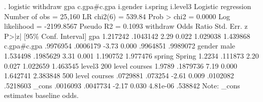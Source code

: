 . logistic withdraw gpa c.gpa\#c.gpa i.gender i.spring i.level3
{\smallskip}
Logistic regression                             Number of obs     =     25,160
                                                LR chi2(6)        =     539.84
                                                Prob > chi2       =     0.0000
Log likelihood = -2199.8567                     Pseudo R2         =     0.1093
{\smallskip}
          withdraw {\VBAR} Odds Ratio   Std. Err.      z    P>|z|     [95\% Conf. Interval]
               gpa {\VBAR}   1.217242   .1043142     2.29   0.022     1.029038    1.439868
                   {\VBAR}
       c.gpa\#c.gpa {\VBAR}   .9976954   .0006179    -3.73   0.000     .9964851    .9989072
                   {\VBAR}
            gender {\VBAR}
             male  {\VBAR}   1.534498   .1985629     3.31   0.001     1.190752    1.977476
                   {\VBAR}
            spring {\VBAR}
           Spring  {\VBAR}     1.2234    .111873     2.20   0.027     1.022659    1.463545
                   {\VBAR}
            level3 {\VBAR}
200 level courses  {\VBAR}     1.9789   .1879736     7.19   0.000     1.642741    2.383848
500 level courses  {\VBAR}   .0729881    .073254    -2.61   0.009     .0102082    .5218603
                   {\VBAR}
             _cons {\VBAR}   .0016093   .0047734    -2.17   0.030     4.81e-06     .538842
Note: _cons estimates baseline odds.
{\smallskip}
